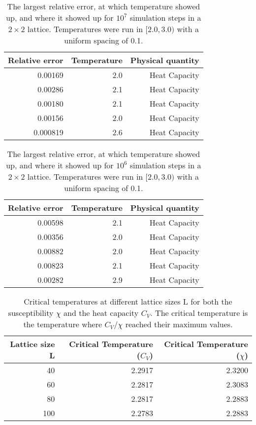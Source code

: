 \documentclass[10pt,a4paper]{article}
\begin{document}
\begin{table}[H]
\centering
\caption[$2\times2$ lattice rel. errors with  $10^7$ simulation steps]{The largest relative error, at which temperature showed up, and where it showed up for $10^7$ simulation steps in a $2\times2$ lattice. Temperatures were run in $[2.0,3.0)$ with a uniform spacing of 0.1.}
\begin{tabular}{|r|r|r|}
\hline
Relative error & Temperature & Physical quantity \\ \hline
0.00169        & 2.0         & Heat Capacity     \\ \hline
0.00286        & 2.1         & Heat Capacity     \\ \hline
0.00180        & 2.1         & Heat Capacity     \\ \hline
0.00156        & 2.0         & Heat Capacity     \\ \hline
0.000819       & 2.6         & Heat Capacity     \\ \hline
\end{tabular}
\end{table}
\begin{table}[H]
\centering
\caption[$2\times2$ lattice rel. errors with  $10^6$ simulation steps]{The largest relative error, at which temperature showed up, and where it showed up for $10^6$ simulation steps in a $2\times2$ lattice. Temperatures were run in $[2.0,3.0)$ with a uniform spacing of 0.1.}
\begin{tabular}{|r|r|r|}
\hline
Relative error & Temperature & Physical quantity \\ \hline
0.00598     & 2.1         & Heat Capacity     \\ \hline
0.00356        & 2.0        & Heat Capacity     \\ \hline
0.00882        & 2.0        & Heat Capacity     \\ \hline
0.00823        & 2.1        & Heat Capacity     \\ \hline
0.00282       & 2.9         & Heat Capacity     \\ \hline
\end{tabular}
\end{table}
\begin{table}[H]
\centering
\caption[Critical Temperatures]{Critical temperatures at different lattice sizes L for both the susceptibility $\chi$ and the heat capacity $C_V$. The critical temperature is the temperature where $C_V$/$\chi$ reached their maximum values.}
\begin{tabular}{|r|r|r|}
\hline
Lattice size L & Critical Temperature ($C_V$) & Critical Temperature ($\chi$) \\ \hline
40             & 2.2917                        & 2.3200                       \\ \hline
60             & 2.2817                        & 2.3083                       \\ \hline
80             & 2.2817                        & 2.2883                       \\ \hline
100            & 2.2783                        & 2.2883                       \\ \hline
\end{tabular}\label{Table of critical temperatures}
\end{table}
\end{document}
